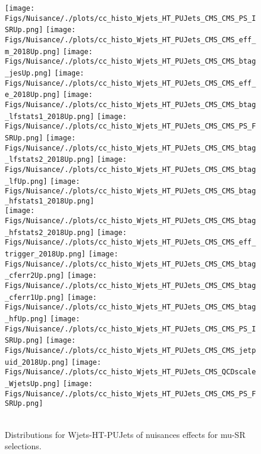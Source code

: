 \begin{figure*}[htbp]  
\centering 
\texttt{[image: Figs/Nuisance/./plots/cc\_histo\_Wjets\_HT\_PUJets\_CMS\_CMS\_PS\_ISRUp.png]}
\texttt{[image: Figs/Nuisance/./plots/cc\_histo\_Wjets\_HT\_PUJets\_CMS\_CMS\_eff\_m\_2018Up.png]}
\texttt{[image: Figs/Nuisance/./plots/cc\_histo\_Wjets\_HT\_PUJets\_CMS\_CMS\_btag\_jesUp.png]}
\texttt{[image: Figs/Nuisance/./plots/cc\_histo\_Wjets\_HT\_PUJets\_CMS\_CMS\_eff\_e\_2018Up.png]}
\texttt{[image: Figs/Nuisance/./plots/cc\_histo\_Wjets\_HT\_PUJets\_CMS\_CMS\_btag\_lfstats1\_2018Up.png]}
\texttt{[image: Figs/Nuisance/./plots/cc\_histo\_Wjets\_HT\_PUJets\_CMS\_CMS\_PS\_FSRUp.png]}
\texttt{[image: Figs/Nuisance/./plots/cc\_histo\_Wjets\_HT\_PUJets\_CMS\_CMS\_btag\_lfstats2\_2018Up.png]}
\texttt{[image: Figs/Nuisance/./plots/cc\_histo\_Wjets\_HT\_PUJets\_CMS\_CMS\_btag\_lfUp.png]}
\texttt{[image: Figs/Nuisance/./plots/cc\_histo\_Wjets\_HT\_PUJets\_CMS\_CMS\_btag\_hfstats1\_2018Up.png]}\\
\texttt{[image: Figs/Nuisance/./plots/cc\_histo\_Wjets\_HT\_PUJets\_CMS\_CMS\_btag\_hfstats2\_2018Up.png]}
\texttt{[image: Figs/Nuisance/./plots/cc\_histo\_Wjets\_HT\_PUJets\_CMS\_CMS\_eff\_trigger\_2018Up.png]}
\texttt{[image: Figs/Nuisance/./plots/cc\_histo\_Wjets\_HT\_PUJets\_CMS\_CMS\_btag\_cferr2Up.png]}
\texttt{[image: Figs/Nuisance/./plots/cc\_histo\_Wjets\_HT\_PUJets\_CMS\_CMS\_btag\_cferr1Up.png]}
\texttt{[image: Figs/Nuisance/./plots/cc\_histo\_Wjets\_HT\_PUJets\_CMS\_CMS\_btag\_hfUp.png]}
\texttt{[image: Figs/Nuisance/./plots/cc\_histo\_Wjets\_HT\_PUJets\_CMS\_CMS\_PS\_ISRUp.png]}
\texttt{[image: Figs/Nuisance/./plots/cc\_histo\_Wjets\_HT\_PUJets\_CMS\_CMS\_jetpuid\_2018Up.png]}
\texttt{[image: Figs/Nuisance/./plots/cc\_histo\_Wjets\_HT\_PUJets\_CMS\_QCDscale\_WjetsUp.png]}
\texttt{[image: Figs/Nuisance/./plots/cc\_histo\_Wjets\_HT\_PUJets\_CMS\_CMS\_PS\_FSRUp.png]}\\
\\ 
\caption{ 
   Distributions for Wjets-HT-PUJets of nuisances effects for mu-SR selections.
} 
\label{fig:Wjets_HT_PUJets_mu_SR} 
\end{figure*} 




